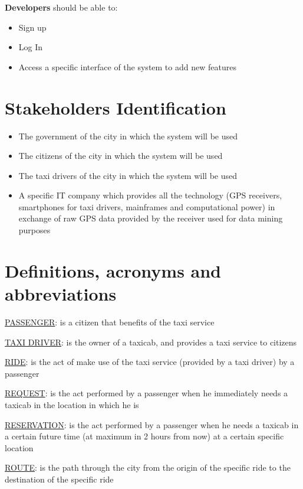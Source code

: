 \noindent \textbf{Developers} should be able to:
\begin{itemize}
	\item Sign up
	\item Log In
	\item Access a specific interface of the system to add new features
\end{itemize}

\section{Stakeholders Identification}
\begin{itemize}
	\item The government of the city in which the system will be used
	\item The citizens of the city in which the system will be used
	\item The taxi drivers of the city in which the system will be used
	\item A specific IT company which provides all the technology (GPS receivers, smartphones for taxi drivers, mainframes and computational power) in exchange of raw GPS data provided by the receiver used for data mining purposes
\end{itemize}

\section{Definitions, acronyms and abbreviations}
\begin{description}
	\item \underline{PASSENGER}: is a citizen that benefits of the taxi service
	\item \underline{TAXI DRIVER}: is the owner of a taxicab, and provides a taxi service to citizens
	\item \underline{RIDE}: is the act of make use of the taxi service (provided by a taxi driver) by a passenger
	\item \underline{REQUEST}: is the act performed by a passenger when he immediately needs a taxicab in the location in which he is 
	\item \underline{RESERVATION}: is the act performed by a passenger when he needs a taxicab in a certain future time (at maximum in 2 hours from now) at a certain specific location
	\item \underline{ROUTE}: is the path through the city from the origin of the specific ride to the destination of the specific ride
\end{description}

